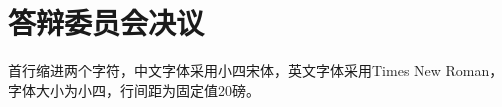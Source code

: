 \chapter{答辩委员会决议}

\setlength{\baselineskip}{20pt}
{

首行缩进两个字符，中文字体采用小四宋体，英文字体采用Times New Roman，字体大小为小四，行间距为固定值20磅。

}